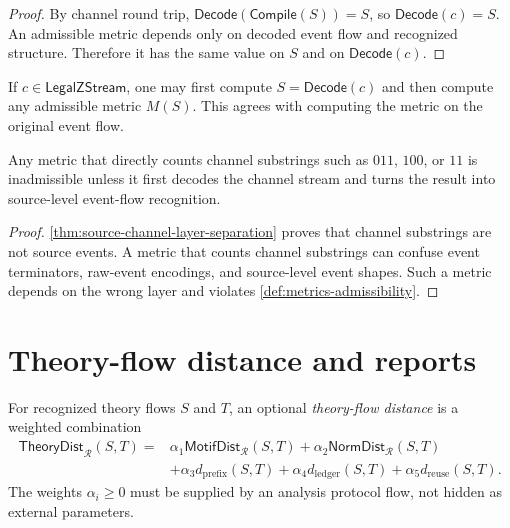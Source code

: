 \begin{proof}
By channel round trip, $\mathsf{Decode}(\mathsf{Compile}(S))=S$, so $\mathsf{Decode}(c)=S$. An admissible metric depends only on decoded event flow and recognized structure. Therefore it has the same value on $S$ and on $\mathsf{Decode}(c)$.
\end{proof}

\begin{corollary}
\label{cor:metrics-computed-from-decoded-code}
If $c\in\mathsf{LegalZStream}$, one may first compute $S=\mathsf{Decode}(c)$ and then compute any admissible metric $M(S)$. This agrees with computing the metric on the original event flow.
\end{corollary}

\begin{proposition}
\label{prop:metrics-channel-substring-inadmissible}
Any metric that directly counts channel substrings such as $011$, $100$, or $11$ is inadmissible unless it first decodes the channel stream and turns the result into source-level event-flow recognition.
\end{proposition}

\begin{proof}
\autoref{thm:source-channel-layer-separation} proves that channel substrings are not source events. A metric that counts channel substrings can confuse event terminators, raw-event encodings, and source-level event shapes. Such a metric depends on the wrong layer and violates \autoref{def:metrics-admissibility}.
\end{proof}

\section{Theory-flow distance and reports}
\label{sec:metrics-theory-distance-reports}

\begin{definition}
\label{def:metrics-theory-flow-distance}
For recognized theory flows $S$ and $T$, an optional \emph{theory-flow distance} is a weighted combination
$$
\begin{aligned}
  \mathsf{TheoryDist}_{\mathcal R}(S,T)
  ={}&
  \alpha_1\mathsf{MotifDist}_{\mathcal R}(S,T)
  +\alpha_2\mathsf{NormDist}_{\mathcal R}(S,T)\\
  &+\alpha_3 d_{\mathrm{prefix}}(S,T)
  +\alpha_4 d_{\mathrm{ledger}}(S,T)
  +\alpha_5 d_{\mathrm{reuse}}(S,T).
\end{aligned}
$$
The weights $\alpha_i\geq 0$ must be supplied by an analysis protocol flow, not hidden as external parameters.
\end{definition}

